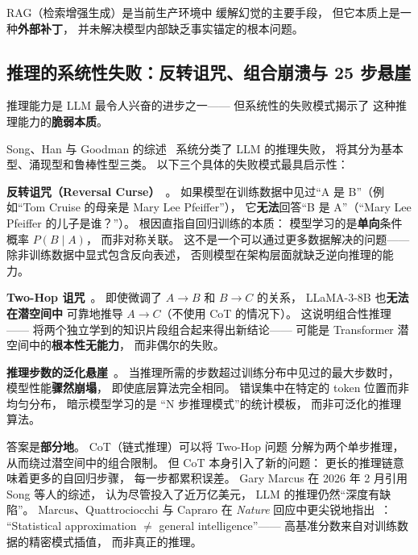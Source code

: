 RAG（检索增强生成）是当前生产环境中
缓解幻觉的主要手段，
但它本质上是一种\textbf{外部补丁}，
并未解决模型内部缺乏事实锚定的根本问题。


\subsection{推理的系统性失败：反转诅咒、组合崩溃与 25 步悬崖}

推理能力是 LLM 最令人兴奋的进步之一——
但系统性的失败模式揭示了
这种推理能力的\textbf{脆弱本质}。

Song、Han 与 Goodman 的综述~\cite{song2026reasoning}
系统分类了 LLM 的推理失败，
将其分为基本型、涌现型和鲁棒性型三类。
以下三个具体的失败模式最具启示性：

\textbf{反转诅咒（Reversal Curse）}~\cite{berglund2023reversal}。
如果模型在训练数据中见过``A 是 B''（例如``Tom Cruise 的母亲是 Mary Lee Pfeiffer''），
它\textbf{无法}回答``B 是 A''（``Mary Lee Pfeiffer 的儿子是谁？''）。
根因直指自回归训练的本质：
模型学习的是\textbf{单向}条件概率 $P(B \mid A)$，
而非对称关联。
这不是一个可以通过更多数据解决的问题——
除非训练数据中显式包含反向表述，
否则模型在架构层面就缺乏逆向推理的能力。

\textbf{Two-Hop 诅咒}~\cite{balesni2025twohop}。
即使微调了 $A \to B$ 和 $B \to C$ 的关系，
LLaMA-3-8B 也\textbf{无法在潜空间中}
可靠地推导 $A \to C$（不使用 CoT 的情况下）。
这说明组合性推理——
将两个独立学到的知识片段组合起来得出新结论——
可能是 Transformer 潜空间中的\textbf{根本性无能力}，
而非偶尔的失败。

\textbf{推理步数的泛化悬崖}~\cite{li2026reasoninghop}。
当推理所需的步数超过训练分布中见过的最大步数时，
模型性能\textbf{骤然崩塌}，
即使底层算法完全相同。
错误集中在特定的 token 位置而非均匀分布，
暗示模型学习的是
``N 步推理模式''的统计模板，
而非可泛化的推理算法。

\begin{whybox}
答案是\textbf{部分地}。
CoT（链式推理）可以将 Two-Hop 问题
分解为两个单步推理，
从而绕过潜空间中的组合限制。
但 CoT 本身引入了新的问题：
更长的推理链意味着更多的自回归步骤，
每一步都累积误差。
Gary Marcus 在 2026 年 2 月引用 Song 等人的综述，
认为尽管投入了近万亿美元，
LLM 的推理仍然``深度有缺陷''。
Marcus、Quattrociocchi 与 Capraro
在 \textit{Nature} 回应中更尖锐地指出~\cite{marcus2026nature}：
``Statistical approximation $\neq$ general intelligence''——
高基准分数来自对训练数据的精密模式插值，
而非真正的推理。
\end{whybox}



